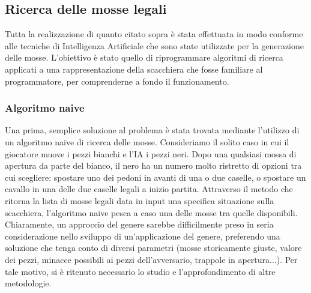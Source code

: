 \subsection{Ricerca delle mosse legali}
Tutta la realizzazione di quanto citato sopra è stata effettuata in modo conforme alle tecniche di Intelligenza Artificiale che sono state utilizzate per la generazione delle mosse. L'obiettivo è stato quello di riprogrammare algoritmi di ricerca applicati a una rappresentazione della scacchiera che fosse familiare al programmatore, per comprenderne a fondo il funzionamento. 

\subsubsection{Algoritmo naive}
Una prima, semplice soluzione al problema è stata trovata mediante l'utilizzo di un algoritmo naive di ricerca delle mosse. Consideriamo il solito caso in cui il giocatore muove i pezzi bianchi e l'IA i pezzi neri. Dopo una qualsiasi mossa di apertura da parte del bianco, il nero ha un numero molto ristretto di opzioni tra cui scegliere: spostare uno dei pedoni in avanti di una o due caselle, o spostare un cavallo in una delle due caselle legali a inizio partita. Attraverso il metodo che ritorna la lista di mosse legali data in input una specifica situazione sulla scacchiera, l'algoritmo naive pesca a caso una delle mosse tra quelle disponibili. Chiaramente, un approccio del genere sarebbe difficilmente preso in seria considerazione nello sviluppo di un'applicazione del genere, preferendo una soluzione che tenga conto di diversi parametri (mosse storicamente giuste, valore dei pezzi, minacce possibili ai pezzi dell'avversario, trappole in apertura...). Per tale motivo, si è ritenuto necessario lo studio e l'approfondimento di altre metodologie. 

